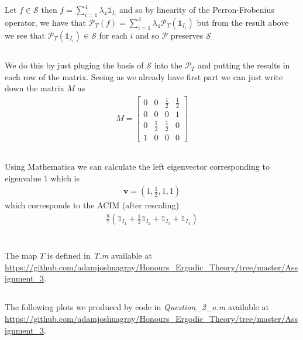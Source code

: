 \documentclass{unswmaths}
\begin{document}
    Let $ f \in \mathcal{S} $ then $ f = \sum_{i=1}^4 \lambda_4 \mathds{1}_{I_i} $ and so by linearity of the Perron-Frobenius operator, we have that $ \mathcal{P}_T(f) = \sum_{i=1}^4 \lambda_4 \mathcal{P}_T(\mathds{1}_{I_i}) $ but from the result above we see that $ \mathcal{P}_T(\mathds{1}_{I_i}) \in \mathcal{S} $ for each $ i $ and so $ \mathcal{P} $ preserves $ \mathcal{S} $
\subsection{}
    We do this by just pluging the basis of $ \mathcal{S} $ into the $ \mathcal{P}_T $ and putting the results in each row of the matrix. Seeing as we already have first part we can just write down the matrix $ M $ as
    \begin{align}
        M = \left[ 
        \begin{array}{cccc}
            0 & 0 & \frac{1}{2} & \frac{1}{2} \\
            0 & 0 & 0 & 1 \\
            0 & \frac{1}{2} & \frac{1}{2} & 0 \\
            1 & 0 & 0 & 0 
        \end{array}
        \right]
    \end{align}
\subsection{}
    Using Mathematica we can calculate the left eigenvector corresponding to eigenvalue 1 which is
    \begin{align}
        \mathbf{v} = (1,\frac{1}{2},1,1)
    \end{align}
    which corresponds to the ACIM (after rescaling)
    \begin{align}
        \frac{8}{7}\left( \mathds{1}_{I_1} + \frac{1}{2}\mathds{1}_{I_2} + \mathds{1}_{I_3} + \mathds{1}_{I_4} \right)
    \end{align}
\clearpage
\section{}
The map $ T $ is defined in \emph{T.m} available at \url{https://github.com/adamjoshuagray/Honours_Ergodic_Theory/tree/master/Assignment_3}.
\subsection{}
The following plots we produced by code in \emph{Question\_2\_a.m} available at \url{https://github.com/adamjoshuagray/Honours_Ergodic_Theory/tree/master/Assignment_3}.
\end{document}

